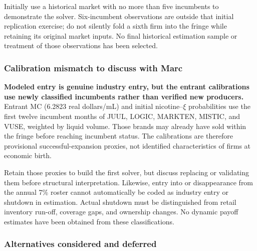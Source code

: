 \documentclass[10pt,]{article}
\begin{document}
Initially use a historical market with no more than five incumbents to
demonstrate the solver. Six-incumbent observations are outside that
initial replication exercise; do not silently fold a sixth firm into the
fringe while retaining its original market inputs. No final historical
estimation sample or treatment of those observations has been selected.

\subsubsection{Calibration mismatch to discuss with
Marc}\label{calibration-mismatch-to-discuss-with-marc}

\textbf{Modeled entry is genuine industry entry, but the entrant
calibrations use newly classified incumbents rather than verified new
producers.} Entrant MC (6.2823 real dollars/mL) and initial
nicotine--\(\xi\) probabilities use the first twelve incumbent months of
JUUL, LOGIC, MARKTEN, MISTIC, and VUSE, weighted by liquid volume. Those
brands may already have sold within the fringe before reaching incumbent
status. The calibrations are therefore provisional successful-expansion
proxies, not identified characteristics of firms at economic birth.

Retain those proxies to build the first solver, but discuss replacing or
validating them before structural interpretation. Likewise, entry into
or disappearance from the annual 7\% roster cannot automatically be
coded as industry entry or shutdown in estimation. Actual shutdown must
be distinguished from retail inventory run-off, coverage gaps, and
ownership changes. No dynamic payoff estimates have been obtained from
these classifications.

\subsubsection{Alternatives considered and
deferred}\label{alternatives-considered-and-deferred}
\end{document}
